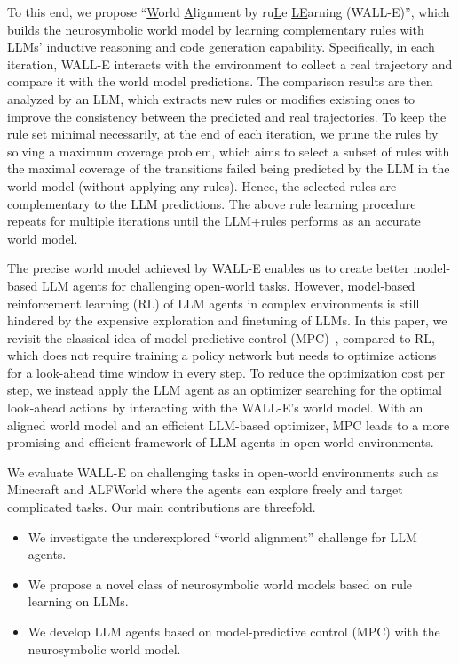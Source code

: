\documentclass{article} %
\newcommand{\ours}{{\scshape WALL-E}\xspace}
\begin{document}
To this end, we propose ``\underline{W}orld \underline{A}lignment by ru\underline{L}e \underline{LE}arning (\ours)'', which builds the neurosymbolic world model by learning complementary rules with LLMs' inductive reasoning and code generation capability. Specifically, in each iteration, \ours interacts with the environment to collect a real trajectory and compare it with the world model predictions. The comparison results are then analyzed by an LLM, which extracts new rules or modifies existing ones to improve the consistency between the predicted and real trajectories. To keep the rule set minimal necessarily, at the end of each iteration, we prune the rules by solving a maximum coverage problem, which aims to select a subset of rules with the maximal coverage of the transitions failed being predicted by the LLM in the world model (without applying any rules). Hence, the selected rules are complementary to the LLM predictions. The above rule learning procedure repeats for multiple iterations until the LLM+rules performs as an accurate world model.  

The precise world model achieved by \ours enables us to create better model-based LLM agents for challenging open-world tasks.  
However, model-based reinforcement learning (RL) of LLM agents in complex environments is still hindered by the expensive exploration and finetuning of LLMs. 
In this paper, we revisit the classical idea of model-predictive control (MPC)~\citep{qin2003survey,hafner2019dream,hafner2020mastering,hafner2023mastering}, compared to RL, which does not require training a policy network but needs to optimize actions for a look-ahead time window in every step. 
To reduce the optimization cost per step, we instead apply the LLM agent as an optimizer searching for the optimal look-ahead actions by interacting with the \ours's world model. With an aligned world model and an efficient LLM-based optimizer, MPC leads to a more promising and efficient framework of LLM agents in open-world environments. 

We evaluate \ours on challenging tasks in open-world environments such as Minecraft and ALFWorld where the agents can explore freely and target complicated tasks. Our main contributions are threefold. 
\begin{itemize}[leftmargin=1em]
    \item We investigate the underexplored ``world alignment'' challenge for LLM agents. 
    \item We propose a novel class of neurosymbolic world models based on rule learning on LLMs. 
    \item We develop LLM agents based on model-predictive control (MPC) with the neurosymbolic world model.  
\end{itemize}
\end{document}
